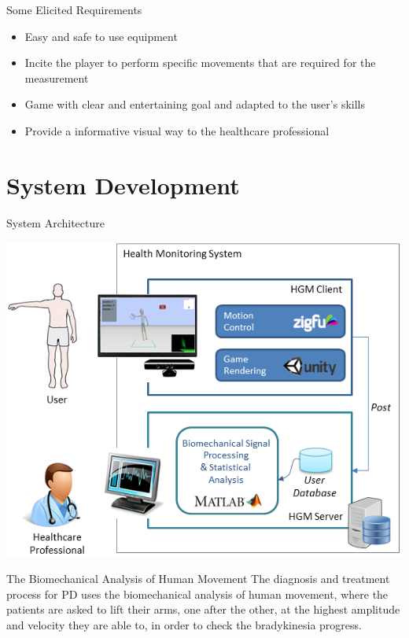 \documentclass{beamer}
\begin{document}
\begin{frame}{}
	\begin{block}{Some Elicited Requirements}
		\begin{itemize}[<+->]
			\item	Easy and safe to use equipment
      \item Incite the player to perform specific movements that are required for the measurement 
      \item Game with clear and entertaining goal and adapted to the user's skills
			\item Provide a informative visual way to the healthcare professional
		\end{itemize}
	\end{block}
\end{frame}




\section{System Development}

\begin{frame}
		 \begin{block}{System Architecture}
			\begin{center}
				\includegraphics[height=2.2 in]{img/systemarchitecture3.png}
			\end{center}
		 \end{block}
\end{frame}


\begin{frame}{}
  \begin{block}{The Biomechanical Analysis of Human Movement}
   The diagnosis and treatment process for PD uses the biomechanical analysis of human movement, where the patients are asked to lift their arms, one after the other, at the highest amplitude and velocity they are able to, in order to check the bradykinesia progress. 
  \end{block}
\end{frame}
\end{document}
